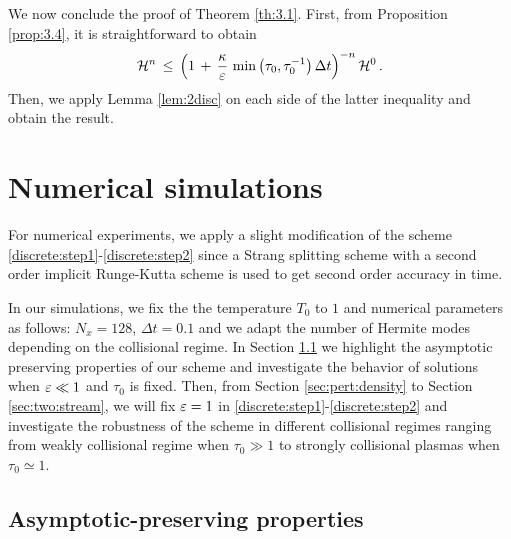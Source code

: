 \documentclass[11pt]{amsart}
\numberwithin{equation}{section}
\numberwithin{figure}{section}
\begin{document}
We now conclude the proof of Theorem \ref{th:3.1}. First, from Proposition \ref{prop:3.4}, it is straightforward to obtain
\[
{\mathcal H}^{n}
\,\leq\,
\left(
1\,+\,\frac{\kappa}{\varepsilon}\,\min{\left(\tau_0,\tau_0^{-1}\right)}\,\Delta t
\right)^{-n}{\mathcal H}^{0}\,.
\]
Then, we apply Lemma \ref{lem:2disc} on each side of the latter inequality and obtain the result.

\section{Numerical simulations}
\label{sec:4}
\setcounter{equation}{0}
\setcounter{figure}{0}
\setcounter{table}{0}

For numerical experiments,  we apply a slight modification of the
scheme \eqref{discrete:step1}-\eqref{discrete:step2} since  a Strang
splitting scheme with a second order implicit Runge-Kutta scheme is used to get second order accuracy in
time.

In our simulations, we fix the the temperature $T_0$ to $1$ and numerical parameters as follows: $N_x=128$, $\Delta t = 0.1$ and we adapt the number of Hermite modes
depending on the collisional regime. In Section \ref{sec:AP} we highlight the asymptotic preserving properties of our scheme and investigate the behavior of solutions when $\varepsilon\ll 1$ and $\tau_0$ is fixed. Then, from Section \ref{sec:pert:density} to Section \ref{sec:two:stream}, we will fix $\varepsilon=1$ in \eqref{discrete:step1}-\eqref{discrete:step2} and investigate the robustness of the scheme in different collisional regimes ranging from weakly collisional regime when $\tau_0\gg 1$
to strongly collisional plasmas when $\tau_0\simeq 1$. 


\subsection{Asymptotic-preserving properties}\label{sec:AP}
\end{document}
